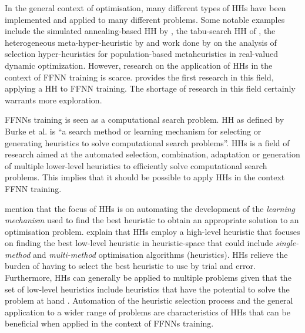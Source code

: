 In the general context of optimisation, many different types of \acp{HH} have been implemented and applied to many different problems. Some notable examples include the simulated annealing-based \ac{HH} by \citeauthor{ref:dowsland:2007} \cite{ref:dowsland:2007}, the tabu-search \ac{HH} of \citeauthor{ref:burke:2010} \cite{ref:burke:2010}, the heterogeneous meta-hyper-heuristic by \citeauthor{ref:grobler:2012} \cite{ref:grobler:2012} and work done by \citeauthor{ref:vanderstockt:2018} \cite{ref:vanderstockt:2018} on the analysis of selection hyper-heuristics for population-based metaheuristics in real-valued dynamic optimization. However, research on the application of \acp{HH} in the context of \acs{FFNN} training is scarce. \citeauthor{ref:nel:2021} \cite{ref:nel:2021} provides the first research in this field, applying a \acs{HH} to \acs{FFNN} training. The shortage of research in this field certainly warrants more exploration.

\acp{FFNN} training is seen as a computational search problem. \Acl{HH} as defined by Burke et al. \cite{ref:burke:2010} is ``a search method or learning mechanism for selecting or generating heuristics to solve computational search problems''. \acp{HH} is a field of research aimed at the automated selection, combination, adaptation or generation of multiple lower-level heuristics to efficiently solve computational search problems. This implies that it should be possible to apply \acp{HH} in the context \acs{FFNN} training.

\citeauthor{ref:grobler:2012} \cite{ref:grobler:2012} mention that the focus of \acp{HH} is on automating the development of the \textit{learning mechanism} used to find the best heuristic to obtain an appropriate solution to an optimisation problem. \citeauthor{ref:grobler:2012} explain that \acp{HH} employ a high-level heuristic that focuses on finding the best low-level heuristic in heuristic-space that could include \textit{single-method} and \textit{multi-method} optimisation algorithms (heuristics). \acp{HH} relieve the burden of having to select the best heuristic to use by trial and error. Furthermore, \acp{HH} can generally be applied to multiple problems given that the set of low-level heuristics include heuristics that have the potential to solve the problem at hand \cite{ref:burke:2010}. Automation of the heuristic selection process and the general application to a wider range of problems are characteristics of \acp{HH} that can be beneficial when applied in the context of \acp{FFNN} training.

